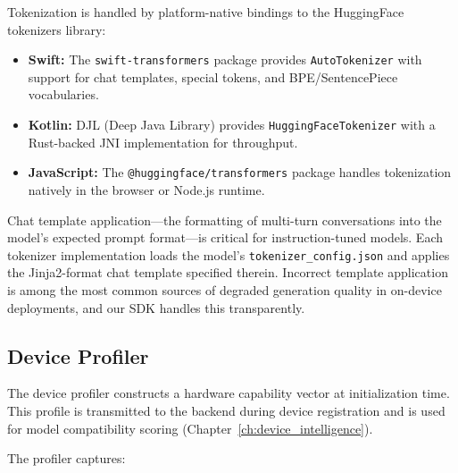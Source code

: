 \documentclass[12pt, letterpaper, twoside]{report}
\begin{document}
Tokenization is handled by platform-native bindings to the HuggingFace tokenizers library:

\begin{itemize}[itemsep=1pt, topsep=2pt, parsep=0pt]
\item \textbf{Swift:} The \texttt{swift-transformers} package provides \texttt{AutoTokenizer} with support for chat templates, special tokens, and BPE/SentencePiece vocabularies.
\item \textbf{Kotlin:} DJL (Deep Java Library) provides \texttt{HuggingFaceTokenizer} with a Rust-backed JNI implementation for throughput.
\item \textbf{JavaScript:} The \texttt{@huggingface/transformers} package handles tokenization natively in the browser or Node.js runtime.
\end{itemize}

Chat template application---the formatting of multi-turn conversations into the model's expected prompt format---is critical for instruction-tuned models. Each tokenizer implementation loads the model's \texttt{tokenizer\_config.json} and applies the Jinja2-format chat template specified therein. Incorrect template application is among the most common sources of degraded generation quality in on-device deployments, and our SDK handles this transparently.

\subsection{Device Profiler}
\label{subsec:device_profiler_arch}

The device profiler constructs a hardware capability vector at initialization time. This profile is transmitted to the backend during device registration and is used for model compatibility scoring (Chapter~\ref{ch:device_intelligence}).

The profiler captures:
\end{document}
